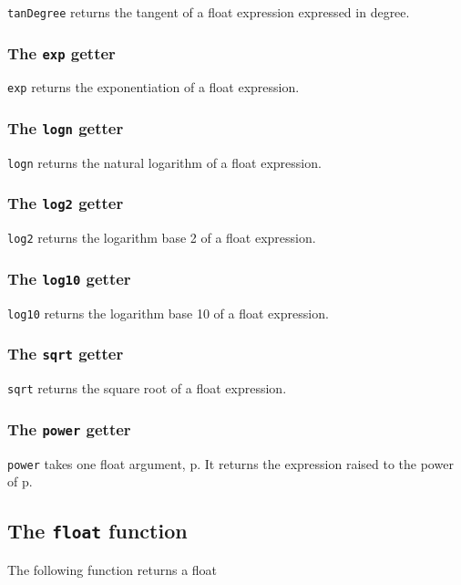\documentclass[10pt,openright,twosides]{report}
\newcommand{\gtltype}[1]{{\small\ttfamily #1}}
\newcommand{\gtlarg}[1]{{\footnotesize\ttfamily\colorbox{light-blue}{#1}}}
\newcommand{\gtlinline}[1]{\colorbox{light-blue}{\lstinline[language=gtl]{#1}}}
\begin{document}
\gtlinline{tanDegree} returns the tangent of a float expression expressed in degree.

\subsubsection{The \texttt{exp} getter}

\gtlinline{exp} returns the exponentiation of a float expression.

\subsubsection{The \texttt{logn} getter}

\gtlinline{logn} returns the natural logarithm of a float expression.

\subsubsection{The \texttt{log2} getter}

\gtlinline{log2} returns the logarithm base 2 of a float expression.
  
\subsubsection{The \texttt{log10} getter}

\gtlinline{log10} returns the logarithm base 10 of a float expression.

\subsubsection{The \texttt{sqrt} getter}

\gtlinline{sqrt} returns the square root of a float expression.

\subsubsection{The \texttt{power} getter}

\gtlinline{power} takes one \gtltype{float} argument, \gtlarg{p}. It returns the expression raised to the  power of \gtlarg{p}.

\subsection{The \texttt{float} function}

The following function returns a \gtltype{float}
\end{document}

